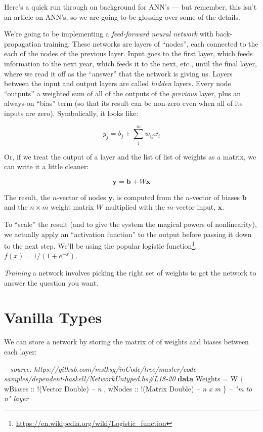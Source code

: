 \documentclass[]{article}
\newenvironment{Shaded}{}{}
\newcommand{\KeywordTok}[1]{\textcolor[rgb]{0.00,0.44,0.13}{\textbf{{#1}}}}
\newcommand{\DataTypeTok}[1]{\textcolor[rgb]{0.56,0.13,0.00}{{#1}}}
\newcommand{\CommentTok}[1]{\textcolor[rgb]{0.38,0.63,0.69}{\textit{{#1}}}}
\newcommand{\OtherTok}[1]{\textcolor[rgb]{0.00,0.44,0.13}{{#1}}}
\newcommand{\FunctionTok}[1]{\textcolor[rgb]{0.02,0.16,0.49}{{#1}}}
\newcommand{\NormalTok}[1]{{#1}}
\renewcommand{\href}[2]{#2\footnote{\url{#1}}}
\begin{document}
Here's a quick run through on background for ANN's --- but remember, this isn't
an article on ANN's, so we are going to be glossing over some of the details.

We're going to be implementing a \emph{feed-forward neural network} with
back-propagation training. These networks are layers of ``nodes'', each
connected to the each of the nodes of the previous layer. Input goes to the
first layer, which feeds information to the next year, which feeds it to the
next, etc., until the final layer, where we read it off as the ``answer'' that
the network is giving us. Layers between the input and output layers are called
\emph{hidden} layers. Every node ``outputs'' a weighted sum of all of the
outputs of the \emph{previous} layer, plus an always-on ``bias'' term (so that
its result can be non-zero even when all of its inputs are zero). Symbolically,
it looks like:

\[
y_j = b_j + \sum_i^m w_{ij} x_i
\]

Or, if we treat the output of a layer and the list of list of weights as a
matrix, we can write it a little cleaner:

\[
\mathbf{y} = \mathbf{b} + W \mathbf{x}
\]

The result, the \(n\)-vector of nodes \(\mathbf{y}\), is computed from the
\(n\)-vector of biases \(\mathbf{b}\) and the \(n \times m\) weight matrix \(W\)
multiplied with the \(m\)-vector input, \(\mathbf{x}\).

To ``scale'' the result (and to give the system the magical powers of
nonlinearity), we actually apply an ``activation function'' to the output before
passing it down to the next step. We'll be using the popular
\href{https://en.wikipedia.org/wiki/Logistic_function}{logistic function},
\(f(x) = 1 / (1 + e^{-x})\).

\emph{Training} a network involves picking the right set of weights to get the
network to answer the question you want.

\section{Vanilla Types}\label{vanilla-types}

We can store a network by storing the matrix of of weights and biases between
each layer:

\begin{Shaded}
\begin{Highlighting}[]
\CommentTok{-- source: https://github.com/mstksg/inCode/tree/master/code-samples/dependent-haskell/NetworkUntyped.hs#L18-20}
\KeywordTok{data} \DataTypeTok{Weights} \FunctionTok{=} \DataTypeTok{W} \NormalTok{\{}\OtherTok{ wBiases ::} \FunctionTok{!}\NormalTok{(}\DataTypeTok{Vector} \DataTypeTok{Double}\NormalTok{)  }\CommentTok{-- n}
                 \NormalTok{,}\OtherTok{ wNodes  ::} \FunctionTok{!}\NormalTok{(}\DataTypeTok{Matrix} \DataTypeTok{Double}\NormalTok{)  }\CommentTok{-- n x m}
                 \NormalTok{\}                              }\CommentTok{-- "m to n" layer}
\end{Highlighting}
\end{Shaded}
\end{document}
